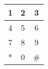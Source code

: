 \begin{table}[!h]
    \centering
    \begin{tabular}{c|c|c}
        1 & 2 & 3  \\ \hline
        4 & 5 & 6  \\ \hline
        7 & 8 & 9  \\ \hline
        * & 0 & \# \\
    \end{tabular}
\end{table}